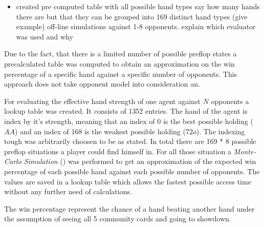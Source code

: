 \begin{itemize}
\item created pre computed table with all possible hand types 
\subitem say how many hands there are but that they can be grouped into 169 distinct hand types (give example)
 off-line simulations against 1-8 opponents.
\subitem explain which evaluator was used and why
\end{itemize}
Due to the fact, that there is a limited number of possible preflop states a precalculated table was computed to obtain an approximation on the win percentage of a specific hand against a specific number of opponents. This approach does not take opponent model into consideration an. \par
For evaluating the effective hand strength of one agent against $N$ opponents a lookup table was created. It consists of 1352 entries. The hand of the agent is index by it's strength, meaning that an index of 0 is the best possible holding ($AA$) and an index of 168 is the weakest possible holding ($72o$). The indexing tough was arbitrarily choosen to be as stated. In total there are 169 * 8 possible preflop situations a player could find himself in. For all those situation a \textit{Monte-Carlo Simulation} () was performed to get an approximation of the expected win percentage of each possible hand against each possible number of opponents. The values are saved in a lookup table which allows the fastest possible access time without any further need of calculations. \par
The win percentage represent the chance of a hand beating another hand under the assumption of seeing all 5 community cards and going to showdown.
